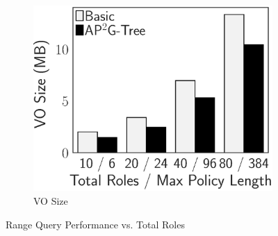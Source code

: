 \begin{figure}[t]
\begin{subfigure}{.33\linewidth}
        \includegraphics[height=\ht\figbox]{exp-figs/access-control/policy_2_vo.eps}
        \caption{VO Size}
    \end{subfigure}
    \caption{Range Query Performance vs. Total Roles}\label{exp-fig:access-control:policy_2}
\end{figure}
